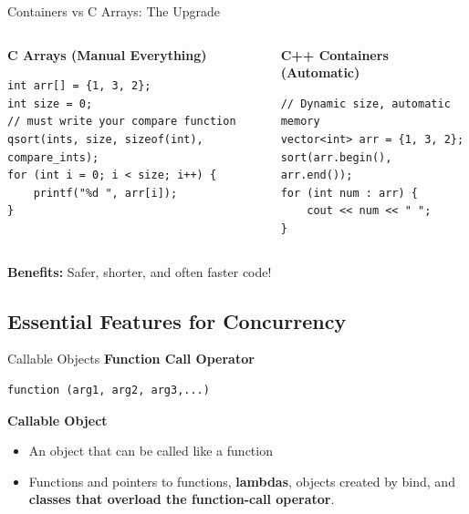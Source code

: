 \begin{frame}[fragile]{Containers vs C Arrays: The Upgrade}
	\begin{columns}
		\begin{column}{0.5\textwidth}
			\textbf{C Arrays (Manual Everything)}
			\begin{verbatim}
int arr[] = {1, 3, 2};
int size = 0;
// must write your compare function
qsort(ints, size, sizeof(int), compare_ints);
for (int i = 0; i < size; i++) {
    printf("%d ", arr[i]);
}
			\end{verbatim}
		\end{column}
		\begin{column}{0.5\textwidth}
			\textbf{C++ Containers (Automatic)}
			\begin{verbatim}
// Dynamic size, automatic memory
vector<int> arr = {1, 3, 2};
sort(arr.begin(), arr.end());
for (int num : arr) {
    cout << num << " ";
}
			\end{verbatim}
		\end{column}
	\end{columns}

	\vspace{0.5em}
	\textbf{Benefits:} Safer, shorter, and often faster code!
\end{frame}

\subsection{Essential Features for Concurrency}
\begin{frame}[fragile]{Callable Objects}
    \textbf{Function Call Operator}
    \begin{verbatim}
function (arg1, arg2, arg3,...)
    \end{verbatim}

    \textbf{Callable Object}
    \begin{itemize}
        \item An object that can be called like a function
        \item Functions and pointers to functions, \textbf{lambdas}, objects created by bind, and \textbf{classes that overload the function-call operator}.
    \end{itemize}
\end{frame}

